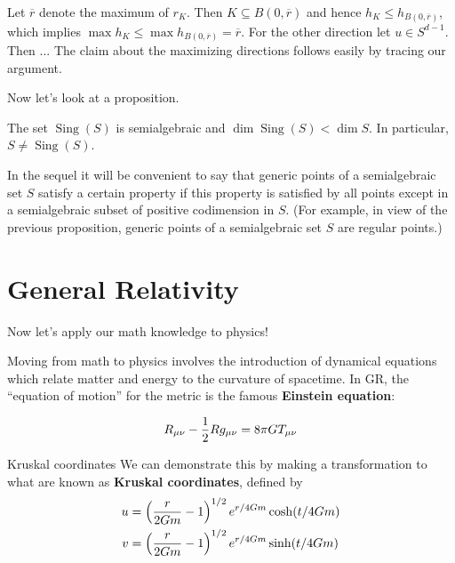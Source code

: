 \begin{pf}
Let $\overline{r}$ denote the maximum of $r_K$. Then $K\subseteq B(0, \overline r)$ and hence $h_K \le h_{B(0,\overline r)}$, which implies $\max h_K\le \max h_{B(0,\overline r)}= \overline r$. For the other direction let $u\in S^{d-1}$. Then ... The claim about the maximizing directions follows easily by tracing our argument.
\end{pf}

Now let's look at a proposition.

\begin{prop}
The set $\operatorname{Sing}(S)$ is semialgebraic and $\dim \operatorname{Sing}(S) < \dim S$. In particular, $S\ne \operatorname{Sing}(S)$.
\end{prop}
\begin{remark}
In the sequel it will be convenient to say that generic points of a semialgebraic set $S$ satisfy
a certain property if this property is satisfied by all points except in a semialgebraic subset of
positive codimension in $S$. (For example, in view of the previous proposition, generic points of
a semialgebraic set $S$ are regular points.)
\end{remark}


\chapter{General Relativity}
Now let's apply our math knowledge to physics!

Moving from math to physics involves the introduction of dynamical equations which relate
matter and energy to the curvature of spacetime. In GR, the “equation of motion” for the
metric is the famous \textbf{Einstein equation}:

\begin{eqbox}
\begin{equation}
R_{\mu\nu}-{1\over 2} R g_{\mu \nu} = 8\pi GT_{\mu\nu}
\end{equation}
\end{eqbox}

\begin{defn}{Kruskal coordinates}
We can
demonstrate this by making a transformation to what are known as \textbf{Kruskal coordinates},
defined by
\begin{equation}
\begin{split}
u &= \left( {r\over 2Gm}-1\right)^{1/2}e^{r/4Gm}\cosh(t/4Gm)\\
v &= \left( {r\over 2Gm}-1\right)^{1/2}e^{r/4Gm}\sinh(t/4Gm)
\end{split}
\end{equation}
\end{defn}

